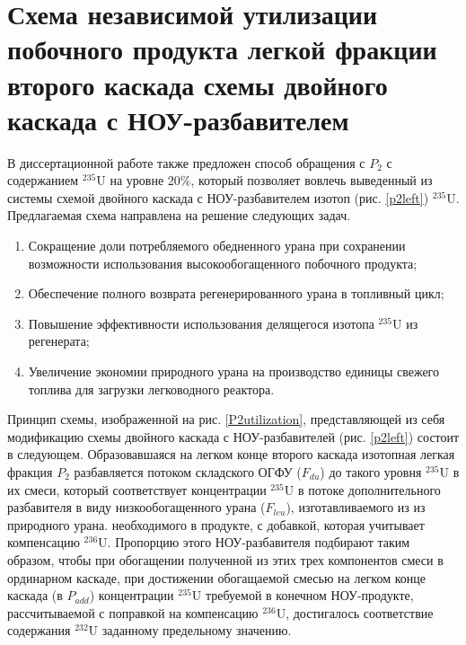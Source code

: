

\section{Схема независимой утилизации побочного продукта легкой фракции второго каскада схемы двойного каскада с НОУ-разбавителем}

В диссертационной работе также предложен способ обращения с $P_2$ с содержанием $^{235}$U на уровне 20\%, который позволяет вовлечь выведенный из системы схемой двойного каскада с НОУ-разбавителем изотоп (рис. \ref{p2left}) $^{235}$U. Предлагаемая схема направлена на решение следующих задач.

\begin{enumerate}
  \item Сокращение доли потребляемого обедненного урана при сохранении возможности использования высокообогащенного побочного продукта;
  \item Обеспечение полного возврата регенерированного урана в топливный цикл;
  \item Повышение эффективности использования делящегося изотопа $^{235}$U из регенерата;
  \item Увеличение экономии природного урана на производство единицы свежего топлива для загрузки легководного реактора.
\end{enumerate}

Принцип схемы, изображенной на рис. \ref{P2utilization}, представляющей из себя модификацию схемы двойного каскада с НОУ-разбавителей (рис. \ref{p2left}) состоит в следующем.
Образовавшаяся на легком конце второго каскада изотопная легкая фракция $P_2$  разбавляется потоком складского ОГФУ ($F_{du}$) до такого уровня $^{235}$U в их смеси, который соответствует концентрации $^{235}$U в потоке дополнительного разбавителя в виду низкообогащенного урана ($F_{leu}$), изготавливаемого из из природного урана. необходимого в продукте, с добавкой, которая учитывает компенсацию $^{236}$U. Пропорцию этого НОУ-разбавителя подбирают таким образом, чтобы при обогащении полученной из этих трех компонентов смеси в ординарном каскаде, при достижении обогащаемой смесью на легком конце каскада (в  $P_{add}$) концентрации $^{235}$U требуемой в конечном НОУ-продукте, рассчитываемой с поправкой на компенсацию $^{236}$U, достигалось соответствие содержания $^{232}$U заданному предельному значению.

